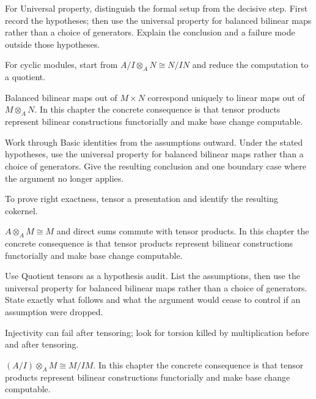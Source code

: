\begin{exercise}\label{exr:v10-03}
For Universal property, distinguish the formal setup from the decisive step. First record the hypotheses; then use the universal property for balanced bilinear maps rather than a choice of generators. Explain the conclusion and a failure mode outside those hypotheses.
\end{exercise}
\begin{hint}
For cyclic modules, start from \(A/I\otimes_A N\cong N/IN\) and reduce the computation to a quotient.
\end{hint}
\begin{solution}
Balanced bilinear maps out of $M\times N$ correspond uniquely to linear maps out of $M\otimes_A N$. In this chapter the concrete consequence is that tensor products represent bilinear constructions functorially and make base change computable.
\end{solution}

\begin{exercise}\label{exr:v10-04}
Work through Basic identities from the assumptions outward. Under the stated hypotheses, use the universal property for balanced bilinear maps rather than a choice of generators. Give the resulting conclusion and one boundary case where the argument no longer applies.
\end{exercise}
\begin{hint}
To prove right exactness, tensor a presentation and identify the resulting cokernel.
\end{hint}
\begin{solution}
$A\otimes_A M\cong M$ and direct sums commute with tensor products. In this chapter the concrete consequence is that tensor products represent bilinear constructions functorially and make base change computable.
\end{solution}

\begin{exercise}\label{exr:v10-05}
Use Quotient tensors as a hypothesis audit. List the assumptions, then use the universal property for balanced bilinear maps rather than a choice of generators. State exactly what follows and what the argument would cease to control if an assumption were dropped.
\end{exercise}
\begin{hint}
Injectivity can fail after tensoring; look for torsion killed by multiplication before and after tensoring.
\end{hint}
\begin{solution}
$(A/I)\otimes_A M\cong M/IM$. In this chapter the concrete consequence is that tensor products represent bilinear constructions functorially and make base change computable.
\end{solution}

